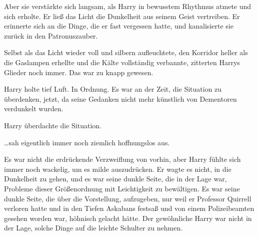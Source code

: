 Aber sie verstärkte sich langsam, als Harry in bewusstem Rhythmus atmete und sich erholte. Er ließ das Licht die Dunkelheit aus seinem Geist vertreiben. Er erinnerte sich an die Dinge, die er fast vergessen hatte, und kanalisierte sie zurück in den Patronuszauber.

Selbst als das Licht wieder voll und silbern aufleuchtete, den Korridor heller als die Gaslampen erhellte und die Kälte vollständig verbannte, zitterten Harrys Glieder noch immer. Das war zu knapp gewesen.

Harry holte tief Luft. In Ordnung. Es war an der Zeit, die Situation zu überdenken, jetzt, da seine Gedanken nicht mehr künstlich von Dementoren verdunkelt wurden.

Harry überdachte die Situation.

…sah eigentlich immer noch ziemlich hoffnungslos aus.

Es war nicht die erdrückende Verzweiflung von vorhin, aber Harry fühlte sich immer noch wackelig, um es milde auszudrücken. Er wagte es nicht, in die Dunkelheit zu gehen, und es war seine dunkle Seite, die in der Lage war, Probleme dieser Größenordnung mit Leichtigkeit zu bewältigen. Es war seine dunkle Seite, die über die Vorstellung, aufzugeben, nur weil er Professor Quirrell verloren hatte und in den Tiefen Askabans festsaß und von einem Polizeibeamten gesehen worden war, höhnisch gelacht hätte. Der gewöhnliche Harry war nicht in der Lage, solche Dinge auf die leichte Schulter zu nehmen.

